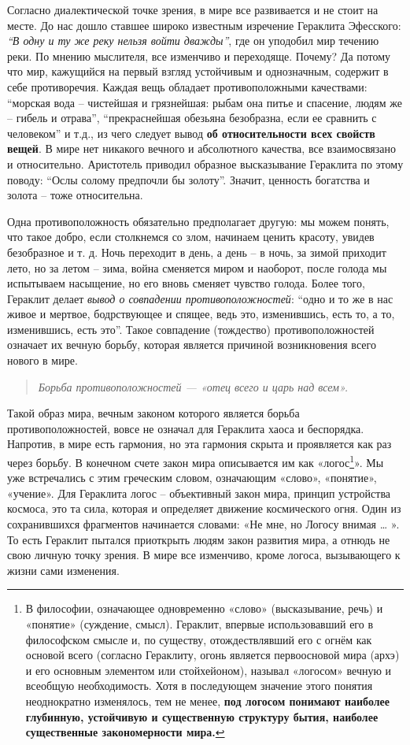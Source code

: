 \documentclass[
]{article}
\begin{document}
Согласно диалектической точке зрения, в мире все развивается и не стоит
на месте. До нас дошло ставшее широко известным изречение Гераклита
Эфесского: \emph{``В одну и ту же реку нельзя войти дважды''}, где он
уподобил мир течению реки. По мнению мыслителя, все изменчиво и
переходяще. Почему? Да потому что мир, кажущийся на первый взгляд
устойчивым и однозначным, содержит в себе противоречия. Каждая вещь
обладает противоположными качествами: ``морская вода -- чистейшая и
грязнейшая: рыбам она питье и спасение, людям же -- гибель и отрава'',
``прекраснейшая обезьяна безобразна, если ее сравнить с человеком'' и
т.д., из чего следует вывод \textbf{об относительности всех свойств
вещей}. В мире нет никакого вечного и абсолютного качества, все
взаимосвязано и относительно. Аристотель приводил образное высказывание
Гераклита по этому поводу: ``Ослы солому предпочли бы золоту''. Значит,
ценность богатства и золота -- тоже относительна.

Одна противоположность обязательно предполагает другую: мы можем понять,
что такое добро, если столкнемся со злом, начинаем ценить красоту,
увидев безобразное и т. д. Ночь переходит в день, а день -- в ночь, за
зимой приходит лето, но за летом -- зима, война сменяется миром и
наоборот, после голода мы испытываем насыщение, но его вновь сменяет
чувство голода. Более того, Гераклит делает \emph{вывод о совпадении
противоположностей}: ``одно и то же в нас живое и мертвое, бодрствующее
и спящее, ведь это, изменившись, есть то, а то, изменившись, есть это''.
Такое совпадение (тождество) противоположностей означает их вечную
борьбу, которая является причиной возникновения всего нового в мире.

\begin{quote}
\emph{Борьба противоположностей --- «отец всего и царь над всем».}
\end{quote}

Такой образ мира, вечным законом которого является борьба
противоположностей, вовсе не означал для Гераклита хаоса и беспорядка.
Напротив, в мире есть гармония, но эта гармония скрыта и проявляется как
раз через борьбу. В конечном счете закон мира описывается им как
«логос\footnote{В философии, означающее одновременно «слово»
  (высказывание, речь) и «понятие» (суждение, смысл). Гераклит, впервые
  использовавший его в философском смысле и, по существу,
  отождествлявший его с огнём как основой всего (согласно Гераклиту,
  огонь является первоосновой мира (архэ) и его основным элементом или
  стойхейоном), называл «логосом» вечную и всеобщую необходимость. Хотя
  в последующем значение этого понятия неоднократно изменялось, тем не
  менее, \textbf{под логосом понимают наиболее глубинную, устойчивую и
  существенную структуру бытия, наиболее существенные закономерности
  мира.}}». Мы уже встречались с этим греческим словом, означающим
«слово», «понятие», «учение». Для Гераклита логос -- объективный закон
мира, принцип устройства космоса, это та сила, которая и определяет
движение космического огня. Один из сохранившихся фрагментов начинается
словами: «Не мне, но Логосу внимая \ldots{} ». То есть Гераклит пытался
приоткрыть людям закон развития мира, а отнюдь не свою личную точку
зрения. В мире все изменчиво, кроме логоса, вызывающего к жизни сами
изменения.
\end{document}
